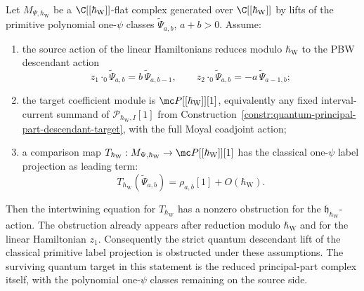 \begin{thm}
  \label{thm:one-psi-label-hbar-obstruction}
  Let \(M_{\Psi,\hbar_{\mathrm{W}}}\) be a \(\C[[\hbar_{\mathrm{W}}]]\)-flat complex generated
  over \(\C[[\hbar_{\mathrm{W}}]]\) by lifts of the primitive polynomial
  one-\(\psi\) classes \(\widetilde\Psi_{a,b}\), \(a+b>0\).  Assume:
  \begin{enumerate}
    \item the source action of the linear Hamiltonians reduces modulo
	      \(\hbar_{\mathrm{W}}\) to the PBW descendant action
      \[
        z_1\cdot_0\widetilde\Psi_{a,b}
          =b\,\widetilde\Psi_{a,b-1},\qquad
        z_2\cdot_0\widetilde\Psi_{a,b}
          =-a\,\widetilde\Psi_{a-1,b};
      \]
    \item the target coefficient module is \(\mc P[[\hbar_{\mathrm{W}}]][1]\),
      equivalently any fixed interval-current summand of
	      \(\mathcal P_{\hbar_{\mathrm{W}},I}[1]\) from
      Construction~\ref{constr:quantum-principal-part-descendant-target},
      with the full Moyal coadjoint action;
    \item a comparison map
		      \(T_{\hbar_{\mathrm{W}}}:M_{\Psi,\hbar_{\mathrm{W}}}\to\mc P[[\hbar_{\mathrm{W}}]][1]\) has the
	      classical one-\(\psi\) label projection as leading term:
      \[
	        T_{\hbar_{\mathrm{W}}}(\widetilde\Psi_{a,b})
	          =\rho_{a,b}[1]+O(\hbar_{\mathrm{W}}).
      \]
  \end{enumerate}
	  Then the intertwining equation for \(T_{\hbar_{\mathrm{W}}}\) has a nonzero
	  obstruction for the \(\mathfrak h_{\hbar_{\mathrm{W}}}\)-action.  The obstruction
	  already appears after reduction modulo \(\hbar_{\mathrm{W}}\) and for the linear
  Hamiltonian \(z_1\).  Consequently the strict quantum descendant lift
  of the classical primitive label projection is obstructed under these
  assumptions.  The surviving quantum target in this statement is the
  reduced principal-part complex itself, with the polynomial
  one-\(\psi\) classes remaining on the source side.
\end{thm}

